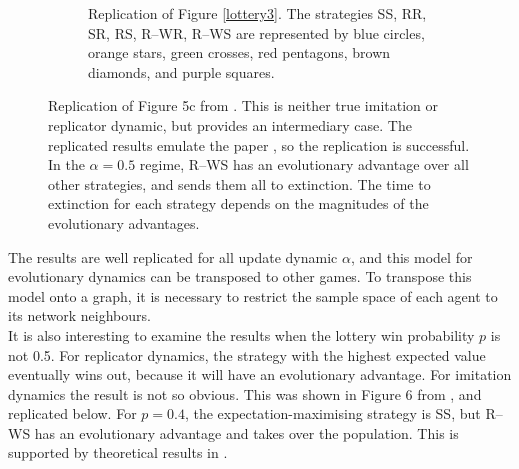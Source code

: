 \begin{figure}[!h]
\begin{subfigure}[b]{0.45\textwidth}
    \caption{Replication of Figure \ref{lottery3}. The strategies SS, RR, SR, RS, R--WR, R--WS are represented by blue circles, orange stars, green crosses, red pentagons, brown diamonds, and purple squares. }
    \label{lottery3_me}
  \end{subfigure}
  \caption{Replication of Figure 5c from \cite{RN30}. This is neither true imitation or replicator dynamic, but provides an intermediary case. The replicated results emulate the paper \cite{RN30}, so the replication is successful. In the $\alpha = 0.5$ regime, R--WS has an evolutionary advantage over all other strategies, and sends them all to extinction. The time to extinction for each strategy depends on the magnitudes of the evolutionary advantages. } \label{lottery_comp2}
\end{figure} 
\FloatBarrier
The results are well replicated for all update dynamic $\alpha$, and this model for evolutionary dynamics can be transposed to other games. To transpose this model onto a graph, it is necessary to restrict the sample space of each agent to its network neighbours. \\

 It is also interesting to examine the results when the lottery win probability $p$ is not 0.5. For replicator dynamics, the strategy with the highest expected value eventually wins out, because it will have an evolutionary advantage. For imitation dynamics the result is not so obvious. This was shown in Figure 6 from \cite{RN30}, and replicated below. For $p=0.4$, the expectation-maximising strategy is SS, but R--WS has an evolutionary advantage and takes over the population. This is supported by theoretical results in \cite{RN30}. 
 
